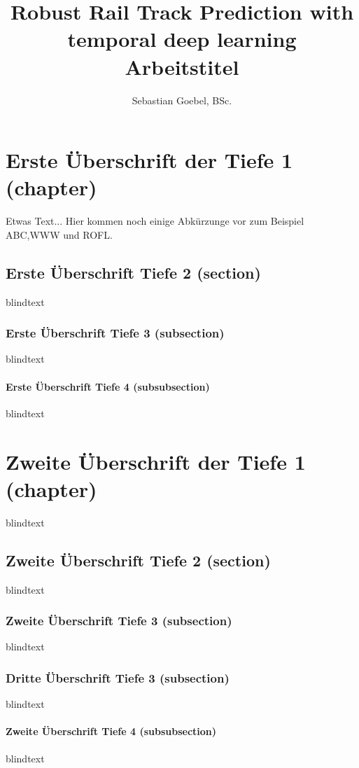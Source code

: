 \documentclass[Master,BMR,english]{BASE/twbook}
\title{Robust Rail Track Prediction with temporal deep learning\\Arbeitstitel}
\author{Sebastian Goebel, BSc.}
\begin{document}
\maketitle
\chapter{Erste Überschrift der Tiefe 1 (chapter)}

Etwas Text... Hier kommen noch einige Abkürzunge vor zum Beispiel \ac{ABC},\ac{WWW} und \ac{ROFL}.

\section{Erste Überschrift Tiefe 2 (section)}
blindtext

\subsection{Erste Überschrift Tiefe 3 (subsection)}
blindtext

\subsubsection{Erste Überschrift Tiefe 4 (subsubsection)}
blindtext

\chapter{Zweite Überschrift der Tiefe 1 (chapter)}
blindtext

\section{Zweite Überschrift Tiefe 2 (section)}
blindtext

\subsection{Zweite Überschrift Tiefe 3 (subsection)}
blindtext

\subsection{Dritte Überschrift Tiefe 3 (subsection)}
blindtext

\subsubsection{Zweite Überschrift Tiefe 4 (subsubsection)}
blindtext
\end{document}
